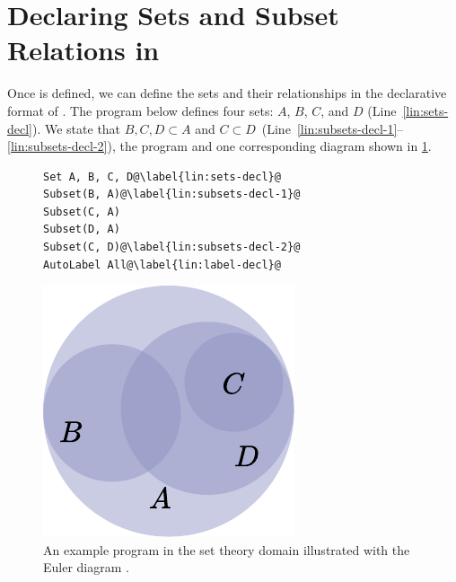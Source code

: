 \section{Declaring Sets and Subset Relations in \Substance}
\label{sec:euler-substance}

Once \Domain is defined, we can define the sets and their relationships in the declarative format of \Substance. The program below defines four sets: \(A\), \(B\), \(C\), and \(D\) (Line~\ref{lin:sets-decl}). We state that $B, C, D \subset A$ and $C \subset D$~(Line~\ref{lin:subsets-decl-1}--\ref{lin:subsets-decl-2}), the \Substance program and one corresponding diagram shown in \cref{fig:euler-sub-example}.

\begin{figure}[h]
    \centering
    \begin{minipage}{.25\linewidth}
    \begin{mdframed}[style=SUBCode]
    \begin{lstlisting}[language=Sub-SET-new,escapechar=@]
Set A, B, C, D@\label{lin:sets-decl}@
Subset(B, A)@\label{lin:subsets-decl-1}@
Subset(C, A)
Subset(D, A)
Subset(C, D)@\label{lin:subsets-decl-2}@
AutoLabel All@\label{lin:label-decl}@\end{lstlisting}
    \end{mdframed}
    \end{minipage}\hspace{2em}
    \begin{minipage}{.3\linewidth}
    \includegraphics[width=\linewidth]{assets/appendix/Sets as Euler Diagram 1.pdf}
    \end{minipage}
    \caption{An example \Substance program in the set theory domain illustrated with the Euler diagram \Style.}
    \label{fig:euler-sub-example}
\end{figure}

